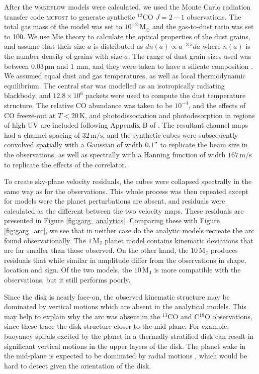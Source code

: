 After the \textsc{wakeflow} models were calculated, we used the Monte Carlo radiation transfer code \textsc{mcfost} \citep{pinte2006,pinte2009} to generate synthetic $^{12}$CO $J=2-1$ observations.
The total gas mass of the model was set to $10^{-2} \, \mathrm{M_\odot}$ \citep{toci2019} and the gas-to-dust ratio was set to 100.
We use Mie theory \citep{mie1908} to calculate the optical properties of the dust grains, and assume that their size $a$ is distributed as $dn(a) \propto a^{-3.5} da$ where $n(a)$ is the number density of grains with size $a$.
The range of dust grain sizes used was between $0.03 \, \mathrm{\mu m}$ and $1$ mm, and they were taken to have a silicate composition \citep{weingartner2001}.
We assumed equal dust and gas temperatures, as well as
local thermodynamic equilibrium.
The central star was modelled as an isotropically radiating blackbody, and $12.8\times 10^6$ packets were used to compute the dust temperature structure.
The relative CO abundance was taken to be $10^{-4}$, and the effects of CO freeze-out at $T < 20\, \mathrm{K}$, and photodissociation and photodesorption in regions of high UV are included following Appendix B of \citet{pinte2018}.
The resultant channel maps had a channel spacing of $32 \, \mathrm{m/s}$, and the synthetic cubes were subsequently convolved spatially with a Gaussian of width $0.1"$ to replicate the beam size in the observations, as well as spectrally with a Hanning function of width $167 \, \mathrm{m/s}$ to replicate the effects of the correlator.

To create sky-plane velocity residuals, the cubes were collapsed spectrally in the same way as for the observations.
This whole process was then repeated except for models were the planet perturbations are absent, and residuals were calculated as the different between the two velocity maps.
These residuals are presented in Figure \ref{fig:garg_analytics}.
Comparing these with Figure \ref{fig:garg_arc}, we see that in neither case do the analytic models recreate the arc found observationally.
The $1 \, \mathrm{M_J}$ planet model contains kinematic deviations that are far smaller than those observed.
On the other hand, the $10 \, \mathrm{M_J}$ produces residuals that while similar in amplitude differ from the observations in shape, location and sign.
Of the two models, the $10 \, \mathrm{M_J}$ is more compatible with the observations, but it still performs poorly.

Since the disk is nearly face-on, the observed kinematic structure may be dominated by vertical motions which are absent in the analytical models.
This may help to explain why the arc was absent in the $^{13}$CO and C$^{18}$O observations, since these trace the disk structure closer to the mid-plane.
For example, buoyancy spirals \citep{zhu2012,bae2021} excited by the planet in a thermally-stratified disk can result in significant vertical motions in the upper layers of the disk.
The planet wake in the mid-plane is expected to be dominated by radial motions \citep{rafikov2002a}, which would be hard to detect given the orientation of the disk.

